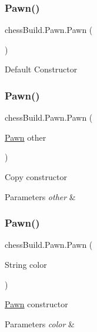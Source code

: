 \subsubsection{\texorpdfstring{Pawn()}{Pawn()}\hspace{0.1cm}{\footnotesize\ttfamily [1/4]}}
{\footnotesize\ttfamily chess\+Build.\+Pawn.\+Pawn (\begin{DoxyParamCaption}{ }\end{DoxyParamCaption})}

Default Constructor \mbox{\label{classchess_build_1_1_pawn_aaf18709e792d82b09e27325a118d1230}} 
\subsubsection{\texorpdfstring{Pawn()}{Pawn()}\hspace{0.1cm}{\footnotesize\ttfamily [2/4]}}
{\footnotesize\ttfamily chess\+Build.\+Pawn.\+Pawn (\begin{DoxyParamCaption}\item[{\hyperlink{classchess_build_1_1_pawn}{Pawn}}]{other }\end{DoxyParamCaption})}

Copy constructor 
\begin{DoxyParams}{Parameters}
{\em other} & \\
\hline
\end{DoxyParams}
\mbox{\label{classchess_build_1_1_pawn_a1e0b4fb3d9b21ef747f2ceb9a2438131}} 
\subsubsection{\texorpdfstring{Pawn()}{Pawn()}\hspace{0.1cm}{\footnotesize\ttfamily [3/4]}}
{\footnotesize\ttfamily chess\+Build.\+Pawn.\+Pawn (\begin{DoxyParamCaption}\item[{String}]{color }\end{DoxyParamCaption})}

\hyperlink{classchess_build_1_1_pawn}{Pawn} constructor 
\begin{DoxyParams}{Parameters}
{\em color} & \\
\hline
\end{DoxyParams}
\mbox{\label{classchess_build_1_1_pawn_adb46f28a04fdd909fadcca6004df07ba}} 
